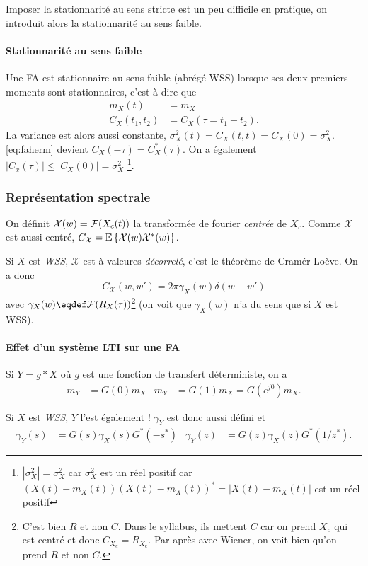Imposer la stationnarité au sens stricte est un peu difficile en pratique,
on introduit alors la stationnarité au sens faible.

\paragraph{Stationnarité au sens faible}
Une FA est stationnaire au sens faible (abrégé WSS) lorsque
ses deux premiers moments sont stationnaires,
c'est à dire que
\begin{align*}
  m_X(t)       & = m_X\\
  C_X(t_1,t_2) & = C_X(\tau = t_1 - t_2). %
\end{align*}
La variance est alors aussi constante,
$\sigma_X^2(t) = C_X(t,t) = C_X(0) = \sigma_X^2$.
\eqref{eq:faherm} devient $C_X(-\tau) = C_X^*(\tau)$.
On a également $|C_x(\tau)| \leq |C_X(0)| = \sigma_X^2$
\footnote{$|\sigma_X^2| = \sigma_X^2$ car $\sigma_X^2$ est un réel positif car
$(X(t)-m_X(t))(X(t)-m_X(t))^* = |X(t)-m_X(t)|$ est un réel positif}.

\subsubsection{Représentation spectrale}
On définit $\mathcal{X}(w) = \mathcal{F}(X_c(t))$ la transformée de fourier
\emph{centrée} de $X_c$.
Comme $\mathcal{X}$ est aussi centré,
$C_\mathcal{X} = \mathbb{E}\left\{\mathcal{X}(w)\mathcal{X}^*(w)\right\}$.

Si $X$ est \emph{WSS}, $\mathcal{X}$ est à valeures \emph{décorrelé},
c'est le théorème de Cramér-Loève. On a donc
\[
  C_\mathcal{X}(w,w') = 2\pi \gamma_X(w) \delta(w - w')
\]
avec $\gamma_X(w) \eqdef \fourier(R_X(\tau))$\footnote{
C'est bien $R$ et non $C$.
Dans le syllabus,
ils mettent $C$ car on prend $X_c$ qui est centré et donc $C_{X_c} = R_{X_c}$.
Par après avec Wiener, on voit bien qu'on prend $R$ et non $C$.}
(on voit que $\gamma_X(w)$ n'a du sens que si $X$ est WSS).

\paragraph{Effet d'un système LTI sur une FA}
Si $Y = g * X$ où $g$ est une fonction de transfert déterministe,
on a
\begin{align*}
  m_Y & = G(0) m_X & m_Y & = G(1) m_X = G(e^{j0}) m_X.
\end{align*}

Si $X$ est \emph{WSS}, $Y$ l'est également !
$\gamma_Y$ est donc aussi défini et%
\begin{align*}
  \gamma_Y(s) & = G(s)\gamma_X(s)G^*(-s^*) & \gamma_Y(z) & = G(z) \gamma_X(z) G^*(1/z^*).
\end{align*}


